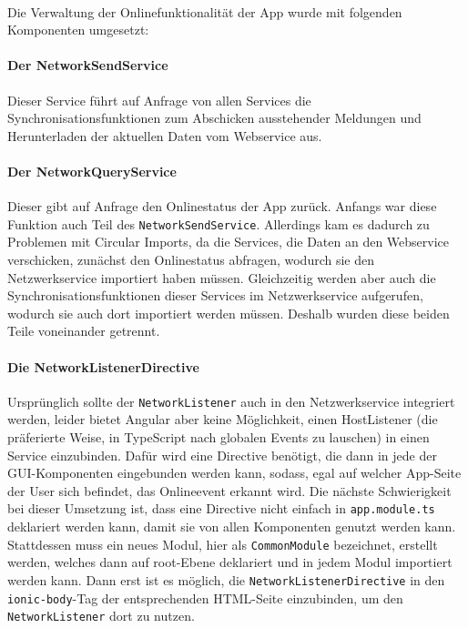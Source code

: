 \documentclass[12pt]{article}
\begin{document}
\paragraph{}
Die Verwaltung der Onlinefunktionalität der App wurde mit folgenden Komponenten umgesetzt: 
\paragraph{Der NetworkSendService} Dieser Service führt auf Anfrage von allen Services die Synchronisationsfunktionen zum Abschicken ausstehender Meldungen und Herunterladen der aktuellen Daten vom Webservice aus.
\paragraph{Der NetworkQueryService} Dieser gibt auf Anfrage den Onlinestatus der App zurück. Anfangs war diese Funktion auch Teil des \texttt{NetworkSendService}. Allerdings kam es dadurch zu Problemen mit Circular Imports, da die Services, die Daten an den Webservice verschicken, zunächst den Onlinestatus abfragen, wodurch sie den Netzwerkservice importiert haben müssen. Gleichzeitig werden aber auch die Synchronisationsfunktionen dieser Services im Netzwerkservice aufgerufen, wodurch sie auch dort importiert werden müssen. Deshalb wurden diese beiden Teile voneinander getrennt.
\paragraph{Die NetworkListenerDirective} Ursprünglich sollte der \texttt{NetworkListener} auch in den Netzwerkservice integriert werden, leider bietet Angular aber keine Möglichkeit, einen HostListener (die präferierte Weise, in TypeScript nach globalen Events zu lauschen) in einen Service einzubinden. Dafür wird eine Directive benötigt, die dann in jede der GUI-Komponenten eingebunden werden kann, sodass, egal auf welcher App-Seite der User sich befindet, das Onlineevent erkannt wird. Die nächste Schwierigkeit bei dieser Umsetzung ist, dass eine Directive nicht einfach in \texttt{app.module.ts} deklariert werden kann, damit sie von allen Komponenten genutzt werden kann. Stattdessen muss ein neues Modul, hier als \texttt{CommonModule} bezeichnet, erstellt werden, welches dann auf root-Ebene deklariert und in jedem Modul importiert werden kann. Dann erst ist es möglich, die \texttt{NetworkListenerDirective} in den \texttt{ionic-body}-Tag der entsprechenden HTML-Seite einzubinden, um den \texttt{NetworkListener} dort zu nutzen.
\end{document}
